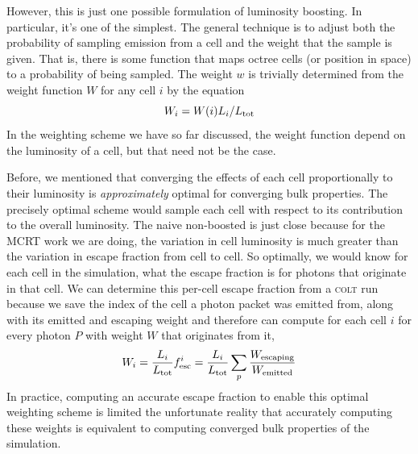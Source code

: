 However, this is just one possible formulation of luminosity boosting.
In particular, it's one of the simplest.
The general technique is to adjust both the probability of sampling emission from a cell and the weight that the sample is given.
That is, there is some function that maps octree cells (or position in space) to a probability of being sampled.
The weight $w$ is trivially determined from the weight function $W$ for any cell $i$ by the equation
\begin{equation}
    W_{i} = W(i)L_{i} / L_{\rm tot}
\end{equation}
In the weighting scheme we have so far discussed, the weight function depend on the luminosity of a cell, but that need not be the case.

Before, we mentioned that converging the effects of each cell proportionally to their luminosity is \emph{approximately} optimal for converging bulk properties.
The precisely optimal scheme would sample each cell with respect to its contribution to the overall luminosity.
The naive non-boosted is just close because for the MCRT work we are doing, the variation in cell luminosity is much greater than the variation in escape fraction from cell to cell.
So optimally, we would know for each cell in the simulation, what the escape fraction is for photons that originate in that cell.
We can determine this per-cell escape fraction from a \textsc{colt} run because we save the index of the cell a photon packet was emitted from, along with its emitted and escaping weight and therefore can compute for each cell $i$ for every photon $P$ with weight $W$ that originates from it,
\begin{equation}
    W_{i} = \frac{L_{i}}{L_{\rm tot}}f_{\rm esc}^{i} =\frac{L_{i}}{L_{\rm tot}} \sum_{p}\frac{W_{\rm escaping}}{W_{\rm emitted}}
\end{equation}
In practice, computing an accurate escape fraction to enable this optimal weighting scheme is limited the unfortunate reality that accurately computing these weights is equivalent to computing converged bulk properties of the simulation.\\

